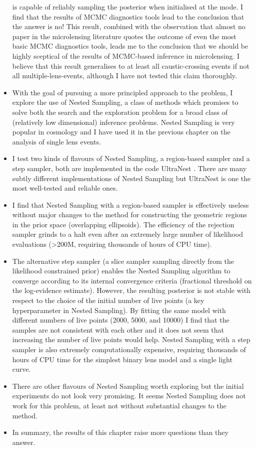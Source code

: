 \documentclass[12pt,dvipsnames]{report}
\newcommand{\ssf}[1]{\textsf{#1}}
\begin{document}
\begin{itemize}
is capable of reliably sampling the posterior when initialised at the mode. I find that 
the results of MCMC diagnostics tools lead to the conclusion that the answer is no! This result, combined
with the observation that almost no paper in the microlensing literature quotes the outcome
of even the most basic MCMC diagnostics tools, leads me to the conclusion that we should be 
highly sceptical of the results of MCMC-based inference in microlensing. I believe that this 
result generalises to at least all caustic-crossing events if not all multiple-lens-events, 
although I have not tested this claim thoroughly.
\item With the goal of pursuing a more principled approach to the problem, I explore 
the use of Nested Sampling, a class of methods which promises to solve both the search 
and the exploration problem for a broad class of (relatively low dimensional) inference 
problems. Nested Sampling is very popular in cosmology and I have used it in the previous 
chapter on the analysis of single lens events.
\item I test two kinds of flavours of Nested Sampling, a region-based sampler and 
a step sampler, both are implemented in the code \ssf{UltraNest} \citet{2021JOSS....6.3001B}.
There are many subtly different implementations of Nested Sampling but \ssf{UltraNest}
is one the most well-tested and reliable ones. 
\item I find that Nested Sampling with a region-based sampler is effectively useless
without major changes to the method for constructing the geometric regions in the prior space
(overlapping ellipsoids). The efficiency of the rejection sampler 
grinds to a halt even after an extremely large number of likelihood evaluations (>200M, 
requiring thousands of hours of CPU time).
\item The alternative step sampler (a slice sampler sampling directly from the likelihood 
constrained prior) enables the Nested Sampling algorithm to converge according to its 
internal convergence criteria (fractional threshold on the log-evidence estimate). 
However, the resulting posterior is not stable with respect to the choice of the initial
number of live points (a key hyperparameter in Nested Sampling). By fitting the same model 
with different numbers of live points (2000, 5000, and 10000) I find that the samples 
are not consistent with each other and it does not seem that increasing the number 
of live points would help. Nested Sampling with a step sampler is also extremely computationally 
expensive, requiring thousands of hours of CPU time for the simplest binary lens model 
and a single light curve.
\item There are other flavours of Nested Sampling worth exploring but the initial experiments 
do not look very promising. It seems Nested Sampling does not work for this problem, at least
not without substantial changes to the method.
\item In summary, the results of this chapter raise more questions than they answer.
\end{itemize}
\end{document}
